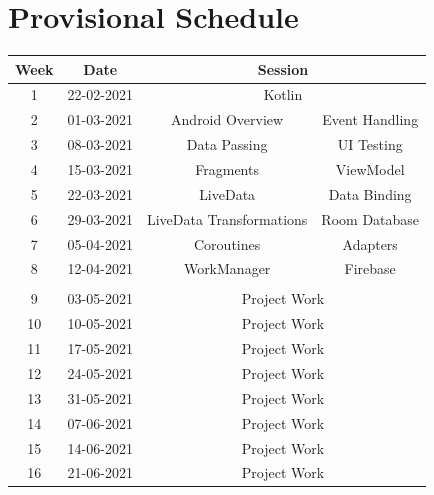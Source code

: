 \documentclass{article}
\begin{document}
\section*{Provisional Schedule}
\renewcommand{\arraystretch}{1.5}
\begin{tabular}{|c|c|c|c|}
	\hline
	\textbf{Week} & \textbf{Date}     & \multicolumn{2}{c|}{\textbf{Session}}          \\ \hline
	\small 1 & \small 22-02-2021 & \multicolumn{2}{c|}{\small Kotlin}             \\ \hline
	\small 2 & \small 01-03-2021 & Android Overview         & Event Handling \\ \hline
	\small 3 & \small 08-03-2021 & Data Passing             & UI Testing     \\ \hline
	\small 4 & \small 15-03-2021 & Fragments                & ViewModel      \\ \hline
	\small 5 & \small 22-03-2021 & LiveData                 & Data Binding   \\ \hline
	\small 6 & \small 29-03-2021 & LiveData Transformations & Room Database  \\ \hline
	\small 7 & \small 05-04-2021 & Coroutines               & Adapters       \\ \hline
	\small 8 & \small 12-04-2021 & WorkManager              & Firebase       \\ \hline
	\rowcolor{yellow} \multicolumn{4}{|c|}{\small Mid Term Break}  \\ \hline
	\small 9      & \small 03-05-2021 & \multicolumn{2}{c|}{\small Project Work}       \\ \hline
	\small 10     & \small 10-05-2021 & \multicolumn{2}{c|}{\small Project Work}       \\ \hline
	\small 11     & \small 17-05-2021 & \multicolumn{2}{c|}{\small Project Work}       \\ \hline
	\small 12     & \small 24-05-2021 & \multicolumn{2}{c|}{\small Project Work}       \\ \hline
	\small 13     & \small 31-05-2021 & \multicolumn{2}{c|}{\small Project Work}       \\ \hline
	\small 14     & \small 07-06-2021 & \multicolumn{2}{c|}{\small Project Work}       \\ \hline
	\small 15     & \small 14-06-2021 & \multicolumn{2}{c|}{\small Project Work}       \\ \hline
	\small 16     & \small 21-06-2021 & \multicolumn{2}{c|}{\small Project Work}       \\ \hline
\end{tabular}
\end{document}

